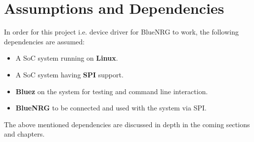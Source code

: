 \section{Assumptions and Dependencies}
In order for this project i.e. device driver for BlueNRG to work, the following dependencies are assumed:
\begin{itemize}
	\item A SoC system running on \textbf{Linux}.
	\item A SoC system having \textbf{SPI} support.
	\item \textbf{Bluez} on the system for testing and command line interaction.
	\item \textbf{BlueNRG} to be connected and used with the system via SPI.
\end{itemize}
The above mentioned dependencies are discussed in depth in the coming sections and chapters.


